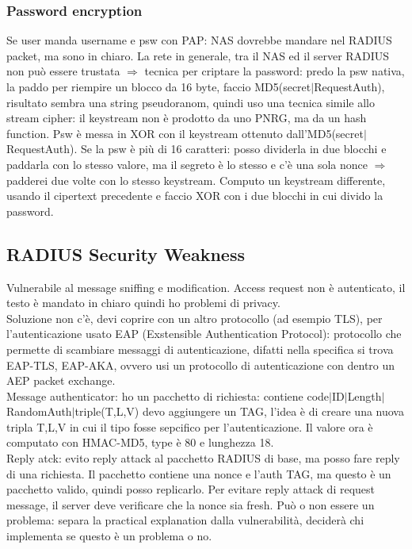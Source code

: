 \documentclass[16px]{article}
\begin{document}
\subsubsection{Password encryption}
Se user manda username e psw con PAP: NAS dovrebbe mandare nel RADIUS packet, ma sono in chiaro. La rete in generale, tra il NAS ed il server RADIUS non può essere trustata $\Rightarrow$ tecnica per criptare la password: predo la psw nativa, la paddo per riempire un blocco da 16 byte, faccio MD5(secret$|$RequestAuth), risultato sembra una string pseudoranom, quindi uso una tecnica simile allo stream cipher: il keystream non è prodotto da uno PNRG, ma da un hash function. Psw è messa in XOR con il keystream ottenuto dall'MD5(secret$|$RequestAuth). Se la psw è più di 16 caratteri: posso dividerla in due blocchi e paddarla con lo stesso valore, ma il segreto è lo stesso e c'è una sola nonce $\Rightarrow$ padderei due volte con lo stesso keystream. Computo un keystream differente, usando il cipertext precedente e faccio XOR con i due blocchi in cui divido la password.
\subsection{RADIUS Security Weakness}
Vulnerabile al message sniffing e modification. Access request non è autenticato, il testo è mandato in chiaro quindi ho problemi di privacy.\\ Soluzione non c'è, devi coprire con un altro protocollo (ad esempio TLS), per l'autenticazione usato EAP (Exstensible Authentication Protocol): protocollo che permette di scambiare messaggi di autenticazione, difatti nella specifica si trova EAP-TLS, EAP-AKA, ovvero usi un protocollo di autenticazione con dentro un AEP packet exchange.\\ Message authenticator: ho un pacchetto di richiesta: contiene code$|$ID$|$Length$|$RandomAuth$|$triple(T,L,V) devo aggiungere un TAG, l'idea è di creare una nuova tripla T,L,V in cui il tipo fosse sepcifico per l'autenticazione. Il valore ora è computato con HMAC-MD5, type è 80 e lunghezza 18.\\ Reply atck: evito reply attack al pacchetto RADIUS di base, ma posso fare reply di una richiesta. Il pacchetto contiene una nonce e l'auth TAG, ma questo è un pacchetto valido, quindi posso replicarlo. Per evitare reply attack di request message, il server deve verificare che la nonce sia fresh. Può o non essere un problema: separa la practical explanation dalla vulnerabilità, deciderà chi implementa se questo è un problema o no.
\end{document}
